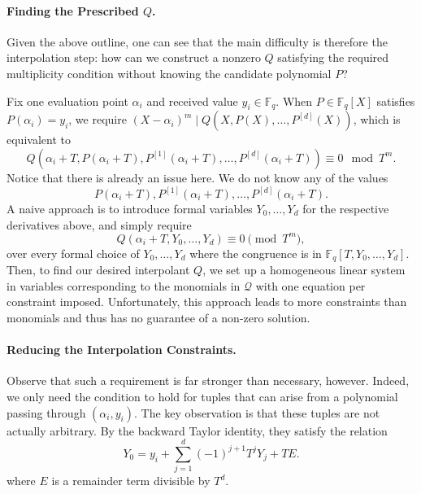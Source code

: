\documentclass[11pt]{article}
\newcommand{\F}{\mathbb F}
\begin{document}
\paragraph{Finding the Prescribed $Q$.}
Given the above outline, one can see that the main difficulty is therefore the interpolation step: how can we construct a nonzero $Q$ satisfying the required multiplicity condition without knowing the candidate polynomial $P$?

Fix one evaluation point $\alpha_i$ and received value $y_i \in \F_q$. When $P\in\F_q[X]$ satisfies $P(\alpha_i)=y_{i}$, we require $(X-\alpha_i)^m\mid Q(X,P(X),\dots,P^{[d]}(X))$, which is equivalent to 
\begin{equation}\label{eq:conditionE}
Q\left(\alpha_i+T,P(\alpha_i+T),P^{[1]}(\alpha_i+T),\dots,P^{[d]}(\alpha_i+T)\right) \equiv 0 \mod T^m.
\end{equation}
Notice that there is already an issue here. We do not know any of the values
\[
P(\alpha_i+T),P^{[1]}(\alpha_i+T),\ldots,P^{[d]}(\alpha_i+T).
\]
A naive approach is to introduce formal variables $Y_0,\ldots, Y_d$ for the respective derivatives above, and simply require 
\begin{equation}\label{eq:conditionF}
Q\left(\alpha_i+T,Y_0,\ldots,Y_d\right)
\equiv 0 \pmod{T^m},
\end{equation}
over every formal choice of $Y_0, \ldots, Y_d$ where the congruence is in $\F_q[T,Y_0,\ldots,Y_d]$. Then, to find our desired interpolant $Q$, we set up a homogeneous linear system in variables corresponding to the monomials in $\mathcal{Q}$ with one equation per constraint imposed. Unfortunately, this approach leads to more constraints than monomials and thus has no guarantee of a non-zero solution.

\paragraph{Reducing the Interpolation Constraints.} Observe that such a requirement is far stronger than
necessary, however. Indeed, we only need the condition to hold for tuples that can arise from
a polynomial passing through $(\alpha_i,y_i)$. The key observation is that these tuples are not actually arbitrary. By the backward
Taylor identity, they satisfy the relation
\begin{equation}\label{eq:E-def}
Y_0
=
y_i+\sum_{j=1}^d(-1)^{j+1}T^jY_j+T E.
\end{equation}
where $E$ is a remainder term divisible by $T^d$. 
\end{document}
